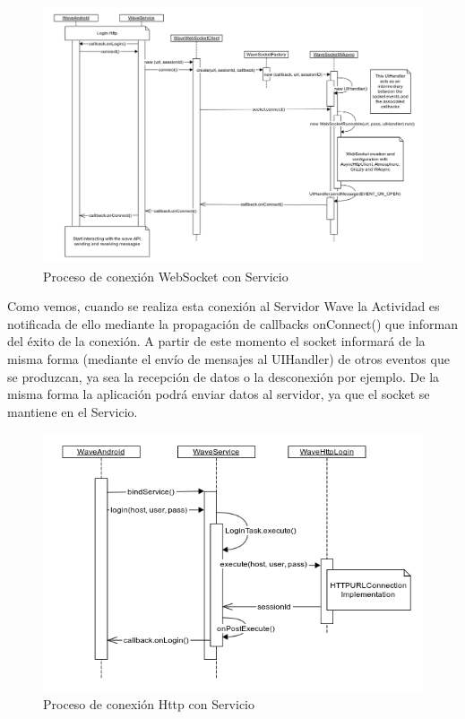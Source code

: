   \begin{figure}[!]
   \centering
	\includegraphics[keepaspectratio, scale=0.43]{Media/Diagrams/waveServerConnectionSequenceDiagram.png}
    \caption{Proceso de conexión WebSocket con Servicio}
   \label{fig:sequenceDiagram_waveWebSocket}
  \end{figure}
     
      Como vemos, cuando se realiza esta conexión al Servidor Wave la Actividad es notificada de ello mediante la propagación de callbacks onConnect() que informan del éxito de la conexión. A partir de este momento el socket informará de la misma forma (mediante el envío de mensajes al UIHandler) de otros eventos que se produzcan, ya sea la recepción de datos o la desconexión por ejemplo. De la misma forma la aplicación podrá enviar datos al servidor, ya que el socket se mantiene en el Servicio. 
      
        \begin{figure}[!]
   \centering
	\includegraphics[keepaspectratio, scale=0.6]{Media/Diagrams/loginHttpSequenceDiagram.png}
    \caption{Proceso de conexión Http con Servicio}
   \label{fig:sequenceDiagram_waveHttp}
  \end{figure}
      
